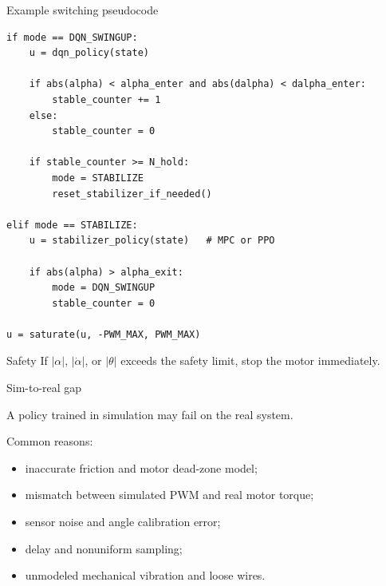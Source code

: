 \documentclass[aspectratio=169]{beamer}
\begin{document}
\begin{frame}[fragile]{Example switching pseudocode}

\begin{lstlisting}[basicstyle=\ttfamily\tiny]
if mode == DQN_SWINGUP:
    u = dqn_policy(state)

    if abs(alpha) < alpha_enter and abs(dalpha) < dalpha_enter:
        stable_counter += 1
    else:
        stable_counter = 0

    if stable_counter >= N_hold:
        mode = STABILIZE
        reset_stabilizer_if_needed()

elif mode == STABILIZE:
    u = stabilizer_policy(state)   # MPC or PPO

    if abs(alpha) > alpha_exit:
        mode = DQN_SWINGUP
        stable_counter = 0

u = saturate(u, -PWM_MAX, PWM_MAX)
\end{lstlisting}

\vspace{0.12cm}

\begin{alertblock}{Safety}
\small
If \(|\alpha|\), \(|\dot{\alpha}|\), or \(|\theta|\) exceeds the safety limit, stop the motor immediately.
\end{alertblock}

\end{frame}

\begin{frame}{Sim-to-real gap}

A policy trained in simulation may fail on the real system.

\vspace{0.2cm}

Common reasons:
\begin{itemize}
    \item inaccurate friction and motor dead-zone model;
    \vspace{0.15cm}
    \item mismatch between simulated PWM and real motor torque;
    \vspace{0.15cm}
    \item sensor noise and angle calibration error;
    \vspace{0.15cm}
    \item delay and nonuniform sampling;
    \vspace{0.15cm}
    \item unmodeled mechanical vibration and loose wires.
\end{itemize}

\vspace{0.2cm}


\end{frame}
\end{document}
